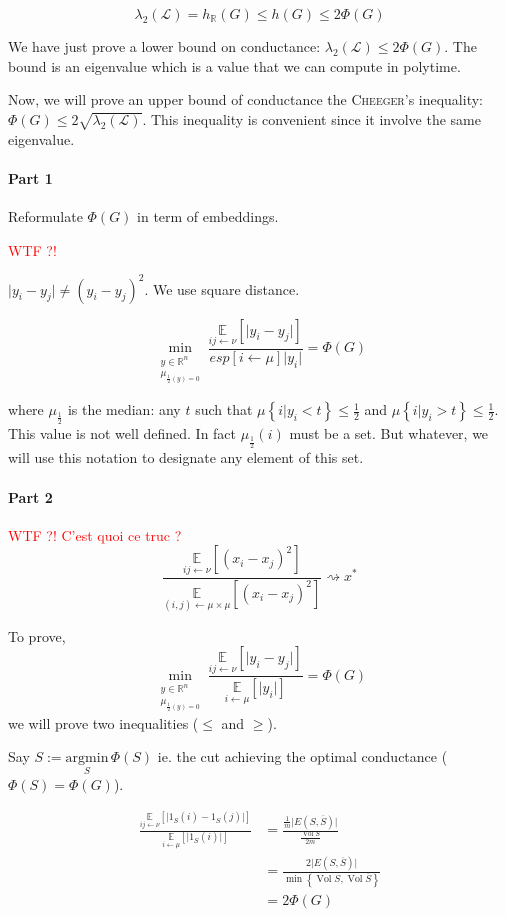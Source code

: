 \documentclass[12pt]{article}
\newcommand{\EE}{\mathbb{E}}
\newcommand{\RR}{\mathbb{R}}
\renewcommand{\L}{\mathcal{L}}
\newcommand{\set}[1]{\left\{ #1 \right\}}
\newcommand{\wtf}[1]{\Huge\textcolor{red}{WTF ?! #1}\normalsize}
\newcommand{\argmin}{\text{argmin}}
\newcommand{\la}{\leftarrow}
\newcommand{\esp}[2][]{\underset{#1}{\EE}\left[ #2 \right]}
\DeclareMathOperator{\vol}{Vol}
\begin{document}
\[
    \lambda_2(\L) = h_\RR(G) \leqslant h(G) \leqslant 2\Phi(G)
\]

We have just prove a lower bound on conductance: $\lambda_2(\L) \leqslant 2\Phi(G)$. The bound is an eigenvalue which is a value that we can compute in polytime.

Now, we will prove an upper bound of conductance the \textsc{Cheeger}'s inequality: $\Phi(G) \leqslant 2\sqrt{\lambda_2(\L)}$. This inequality is convenient since it involve the same eigenvalue.

\paragraph{Part 1}

Reformulate $\Phi(G)$ in term of embeddings.

\wtf{}

$\lvert y_i -y_j \rvert \neq (y_i-y_j)^2$. We use square distance.

\[
    \min\limits_{\substack{y\in\RR^n\\\mu_{\frac{1}{2}(y)=0}}} \frac{\esp[ij\la\nu]{\lvert y_i-y_j\rvert}}{esp[i\la\mu]{\lvert y_i \rvert}} = \Phi(G)
\]

where $\mu_{\frac{1}{2}}$ is the median: any $t$ such that $\mu\set{i\vert y_i < t} \leqslant \frac{1}{2}$ and $\mu\set{i\vert y_i >t} \leqslant \frac{1}{2}$. This value is not well defined. In fact $\mu_{\frac{1}{2}}(i)$ must be a set. But whatever, we will use this notation to designate any element of this set.


\paragraph{Part 2}
\wtf{C'est quoi ce truc ?}
\[
    \frac{\esp[ij\la\nu]{(x_i-x_j)^2}}{\esp[(i,j)\la\mu\times\mu]{(x_i-x_j)^2}} \rightsquigarrow x^*
\]



To prove,
\[
    \min\limits_{\substack{y\in\RR^n\\\mu_{\frac{1}{2}(y)=0}}} \frac{\esp[ij\la\nu]{\lvert y_i-y_j\rvert}}{\esp[i\la\mu]{\lvert y_i \rvert}} = \Phi(G)
\]
we will prove two inequalities ($\leqslant$ and $\geqslant$).

\bigskip

Say $S:=\underset{S}{\argmin}\,\Phi(S)$ ie. the cut achieving the optimal conductance ($\Phi(S) = \Phi(G)$).

\[
    \begin{aligned}
        \frac{\esp[ij\la\nu]{\lvert1_S(i)-1_S(j)\rvert}}{\esp[i\la\mu]{\lvert 1_S(i)\rvert}} &= \frac{\frac{1}{m}\lvert E(S,\overline{S})\rvert}{\frac{\vol S}{2m}}\\
        &= \frac{2\lvert E(S,\overline{S}) \rvert}{\min\set{\vol S, \vol \overline{S}}}\\
        &= 2 \Phi(G)
    \end{aligned}
\]
\end{document}
